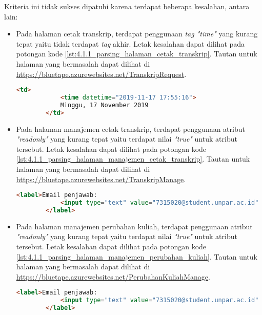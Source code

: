 Kriteria ini tidak sukses dipatuhi karena terdapat beberapa kesalahan, antara lain:

\begin{itemize}
    \item Pada halaman cetak transkrip, terdapat penggunaan \textit{tag "time"} yang kurang tepat yaitu tidak terdapat \textit{tag} akhir. Letak kesalahan dapat dilihat pada potongan kode \ref{lst:4.1.1_parsing_halaman_cetak_transkrip}. Tautan untuk halaman yang bermasalah dapat dilihat di \url{https://bluetape.azurewebsites.net/TranskripRequest}.
    \begin{lstlisting}[frame=single, label={lst:4.1.1_parsing_halaman_cetak_transkrip}, language=HTML, caption=Kriteria Sukses 4.1.1 - Kesalahan Elemen pada Halaman Cetak Transkrip]
        <td>
            <time datetime="2019-11-17 17:55:16">
            Minggu, 17 November 2019
        </td>
    \end{lstlisting}
    
    \item Pada halaman manajemen cetak transkrip, terdapat penggunaan atribut \textit{"readonly"} yang kurang tepat yaitu terdapat nilai \textit{"true"} untuk atribut tersebut. Letak kesalahan dapat dilihat pada potongan kode \ref{lst:4.1.1_parsing_halaman_manajemen_cetak_transkrip}. Tautan untuk halaman yang bermasalah dapat dilihat di \url{https://bluetape.azurewebsites.net/TranskripManage}.
    \begin{lstlisting}[frame=single, label={lst:4.1.1_parsing_halaman_manajemen_cetak_transkrip}, language=HTML, caption=Kriteria Sukses 4.1.1 - Kesalahan Elemen pada Halaman Manajemen Cetak Transkrip]
        <label>Email penjawab:
            <input type="text" value="7315020@student.unpar.ac.id" readonly="true"/>
        </label>
    \end{lstlisting}
    
    \item Pada halaman manajemen perubahan kuliah, terdapat penggunaan atribut \textit{"readonly"} yang kurang tepat yaitu terdapat nilai \textit{"true"} untuk atribut tersebut. Letak kesalahan dapat dilihat pada potongan kode \ref{lst:4.1.1_parsing_halaman_manajemen_perubahan_kuliah}. Tautan untuk halaman yang bermasalah dapat dilihat di \url{https://bluetape.azurewebsites.net/PerubahanKuliahManage}.
    \begin{lstlisting}[frame=single, label={lst:4.1.1_parsing_halaman_manajemen_perubahan_kuliah}, language=HTML, caption=Kriteria Sukses 4.1.1 - Kesalahan Elemen pada Halaman Manajemen Perubahan Kuliah]
        <label>Email penjawab:
            <input type="text" value="7315020@student.unpar.ac.id" readonly="true"/>
        </label>
    \end{lstlisting}


\end{itemize}
